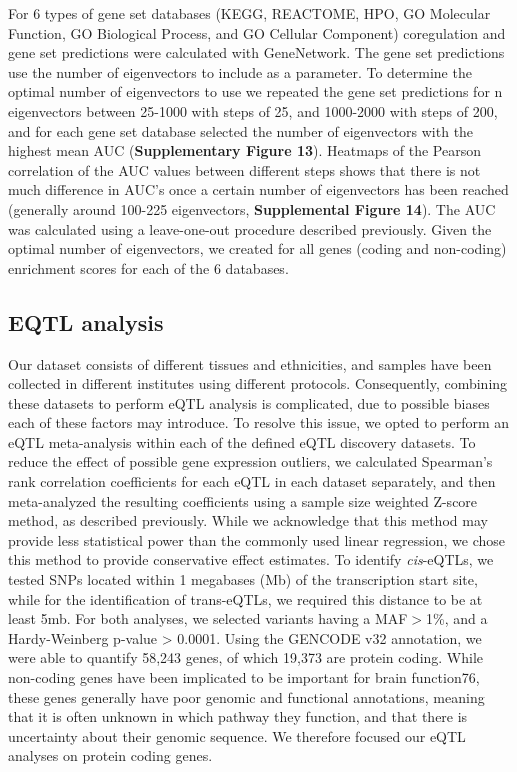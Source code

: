 For 6 types of gene set databases (KEGG, REACTOME, HPO, GO Molecular Function, GO Biological Process, and GO Cellular Component) coregulation and gene set predictions were calculated with GeneNetwork. The gene set predictions use the number of eigenvectors to include as a parameter. To determine the optimal number of eigenvectors to use we repeated the gene set predictions for n eigenvectors between 25-1000 with steps of 25, and 1000-2000 with steps of 200, and for each gene set database selected the number of eigenvectors with the highest mean AUC (\textbf{Supplementary Figure 13}). Heatmaps of the Pearson correlation of the AUC values between different steps shows that there is not much difference in AUC’s once a certain number of eigenvectors has been reached (generally around 100-225 eigenvectors, \textbf{Supplemental Figure 14}). The AUC was calculated using a leave-one-out procedure described previously\cite{jassalReactomePathwayKnowledgebase2020}. Given the optimal number of eigenvectors, we created for all genes (coding and non-coding) enrichment scores for each of the 6 databases. 

\subsection{EQTL analysis}
Our dataset consists of different tissues and ethnicities, and samples have been collected in different institutes using different protocols. Consequently, combining these datasets to perform eQTL analysis is complicated, due to possible biases each of these factors may introduce. To resolve this issue, we opted to perform an eQTL meta-analysis within each of the defined eQTL discovery datasets. To reduce the effect of possible gene expression outliers, we calculated Spearman’s rank correlation coefficients for each eQTL in each dataset separately, and then meta-analyzed the resulting coefficients using a sample size weighted Z-score method, as described previously\cite{vosaUnravelingPolygenicArchitecture2018}. While we acknowledge that this method may provide less statistical power than the commonly used linear regression, we chose this method to provide conservative effect estimates. To identify \emph{cis}-eQTLs, we tested SNPs located within 1 megabases (Mb) of the transcription start site, while for the identification of trans-eQTLs, we required this distance to be at least 5mb. For both analyses, we selected variants having a MAF$>$1\%, and a Hardy-Weinberg p-value > 0.0001. Using the GENCODE v32 annotation, we were able to quantify 58,243 genes, of which 19,373 are protein coding. While non-coding genes have been implicated to be important for brain function76, these genes generally have poor genomic and functional annotations, meaning that it is often unknown in which pathway they function, and that there is uncertainty about their genomic sequence. We therefore focused our eQTL analyses on protein coding genes. 

